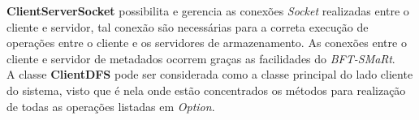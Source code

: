 \textbf{ClientServerSocket} possibilita e gerencia as conexões \textit{Socket} realizadas entre o cliente e servidor, tal conexão são necessárias para a correta execução de operações entre o cliente e os servidores de armazenamento. As conexões entre o cliente e servidor de metadados ocorrem graças as facilidades do \textit{BFT-SMaRt}.
\\


A classe \textbf{ClientDFS} pode ser considerada como a classe principal do lado cliente do sistema, visto que é nela onde estão concentrados os métodos para realização de todas as operações listadas em \textit{Option}.
\\
	
	
	